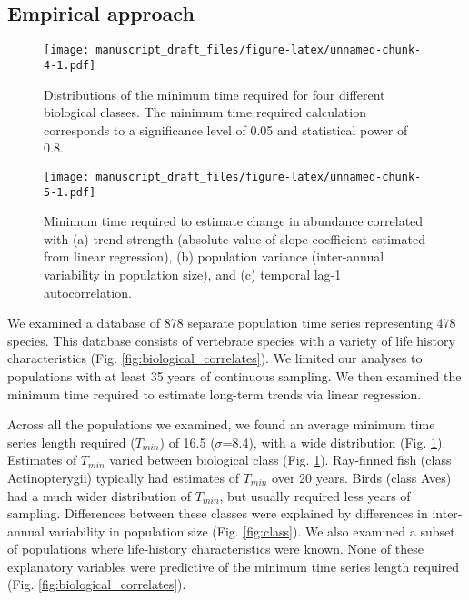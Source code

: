 \documentclass[12pt,]{article}
\begin{document}
\subsection{Empirical approach}\label{empirical-approach-1}

\begin{figure}[htbp]
\centering
\texttt{[image: manuscript\_draft\_files/figure-latex/unnamed-chunk-4-1.pdf]}
\caption{Distributions of the minimum time required for four different
biological classes. The minimum time required calculation corresponds to
a significance level of 0.05 and statistical power of
0.8.\label{fig:min_time_dist}}
\end{figure}

\begin{figure}[htbp]
\centering
\texttt{[image: manuscript\_draft\_files/figure-latex/unnamed-chunk-5-1.pdf]}
\caption{Minimum time required to estimate change in abundance
correlated with (a) trend strength (absolute value of slope coefficient
estimated from linear regression), (b) population variance (inter-annual
variability in population size), and (c) temporal lag-1
autocorrelation.\label{fig:correlates}}
\end{figure}

We examined a database of 878 separate population time series
representing 478 species. This database consists of vertebrate species
with a variety of life history characteristics (Fig.
\ref{fig:biological_correlates}). We limited our analyses to populations
with at least 35 years of continuous sampling. We then examined the
minimum time required to estimate long-term trends via linear
regression.

Across all the populations we examined, we found an average minimum time
series length required (\(T_{min}\)) of 16.5 (\(\sigma\)=8.4), with a
wide distribution (Fig. \ref{fig:min_time_dist}). Estimates of
\(T_{min}\) varied between biological class (Fig.
\ref{fig:min_time_dist}). Ray-finned fish (class Actinopterygii)
typically had estimates of \(T_{min}\) over 20 years. Birds (class Aves)
had a much wider distribution of \(T_{min}\), but usually required less
years of sampling. Differences between these classes were explained by
differences in inter-annual variability in population size (Fig.
\ref{fig:class}). We also examined a subset of populations where
life-history characteristics were known. None of these explanatory
variables were predictive of the minimum time series length required
(Fig. \ref{fig:biological_correlates}).
\end{document}
